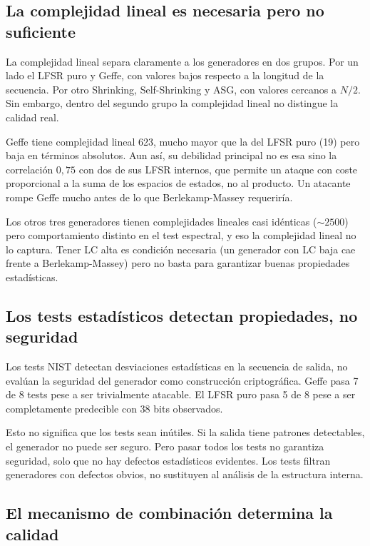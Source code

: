 \subsection{La complejidad lineal es necesaria pero no suficiente}

La complejidad lineal separa claramente a los generadores en dos grupos. Por un lado el LFSR puro y Geffe,
con valores bajos respecto a la longitud de la secuencia. Por otro Shrinking, Self-Shrinking y ASG, con valores cercanos a $N/2$.
Sin embargo, dentro del segundo grupo la complejidad lineal no distingue la calidad real.

Geffe tiene complejidad lineal 623, mucho mayor que la del LFSR puro (19) pero baja en términos absolutos.
Aun así, su debilidad principal no es esa sino la correlación $0{,}75$ con dos de sus LFSR internos,
que permite un ataque con coste proporcional a la suma de los espacios de estados, no al producto.
Un atacante rompe Geffe mucho antes de lo que Berlekamp-Massey requeriría.

Los otros tres generadores tienen complejidades lineales casi idénticas ($\sim 2500$) pero comportamiento distinto en el test espectral,
y eso la complejidad lineal no lo captura. Tener LC alta es condición necesaria (un generador con LC baja cae frente a Berlekamp-Massey)
pero no basta para garantizar buenas propiedades estadísticas.

\subsection{Los tests estadísticos detectan propiedades, no seguridad}

Los tests NIST detectan desviaciones estadísticas en la secuencia de salida, no evalúan la seguridad del generador como construcción criptográfica.
Geffe pasa 7 de 8 tests pese a ser trivialmente atacable. El LFSR puro pasa 5 de 8 pese a ser completamente predecible con 38 bits observados.

Esto no significa que los tests sean inútiles. Si la salida tiene patrones detectables, el generador no puede ser seguro.
Pero pasar todos los tests no garantiza seguridad, solo que no hay defectos estadísticos evidentes.
Los tests filtran generadores con defectos obvios, no sustituyen al análisis de la estructura interna.

\subsection{El mecanismo de combinación determina la calidad}

